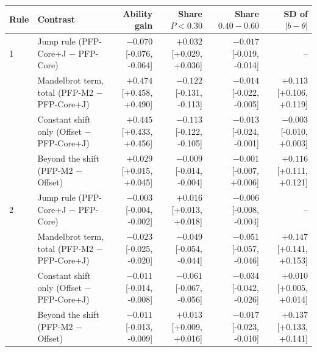 \begin{tabular}{l l r r r r}
\toprule
Rule & Contrast & Ability gain & Share $P<0.30$ & Share $0.40{-}0.60$ & SD of $|b-\theta|$ \\
\midrule
1 & Jump rule (PFP-Core+J $-$ PFP-Core) & $-0.070$ {\scriptsize[-0.076, -0.064]} & $+0.032$ {\scriptsize[+0.029, +0.036]} & $-0.017$ {\scriptsize[-0.019, -0.014]} & -- \\
 & Mandelbrot term, total (PFP-M2 $-$ PFP-Core+J) & $+0.474$ {\scriptsize[+0.458, +0.490]} & $-0.122$ {\scriptsize[-0.131, -0.113]} & $-0.014$ {\scriptsize[-0.022, -0.005]} & $+0.113$ {\scriptsize[+0.106, +0.119]} \\
 & Constant shift only (Offset $-$ PFP-Core+J) & $+0.445$ {\scriptsize[+0.433, +0.456]} & $-0.113$ {\scriptsize[-0.122, -0.105]} & $-0.013$ {\scriptsize[-0.024, -0.001]} & $-0.003$ {\scriptsize[-0.010, +0.003]} \\
 & Beyond the shift (PFP-M2 $-$ Offset) & $+0.029$ {\scriptsize[+0.015, +0.045]} & $-0.009$ {\scriptsize[-0.014, -0.004]} & $-0.001$ {\scriptsize[-0.007, +0.006]} & $+0.116$ {\scriptsize[+0.111, +0.121]} \\
\midrule
2 & Jump rule (PFP-Core+J $-$ PFP-Core) & $-0.003$ {\scriptsize[-0.004, -0.002]} & $+0.016$ {\scriptsize[+0.013, +0.018]} & $-0.006$ {\scriptsize[-0.008, -0.004]} & -- \\
 & Mandelbrot term, total (PFP-M2 $-$ PFP-Core+J) & $-0.023$ {\scriptsize[-0.025, -0.020]} & $-0.049$ {\scriptsize[-0.054, -0.044]} & $-0.051$ {\scriptsize[-0.057, -0.046]} & $+0.147$ {\scriptsize[+0.141, +0.153]} \\
 & Constant shift only (Offset $-$ PFP-Core+J) & $-0.011$ {\scriptsize[-0.014, -0.008]} & $-0.061$ {\scriptsize[-0.067, -0.056]} & $-0.034$ {\scriptsize[-0.042, -0.026]} & $+0.010$ {\scriptsize[+0.005, +0.014]} \\
 & Beyond the shift (PFP-M2 $-$ Offset) & $-0.011$ {\scriptsize[-0.013, -0.009]} & $+0.013$ {\scriptsize[+0.009, +0.016]} & $-0.017$ {\scriptsize[-0.023, -0.010]} & $+0.137$ {\scriptsize[+0.133, +0.141]} \\
\bottomrule
\end{tabular}
